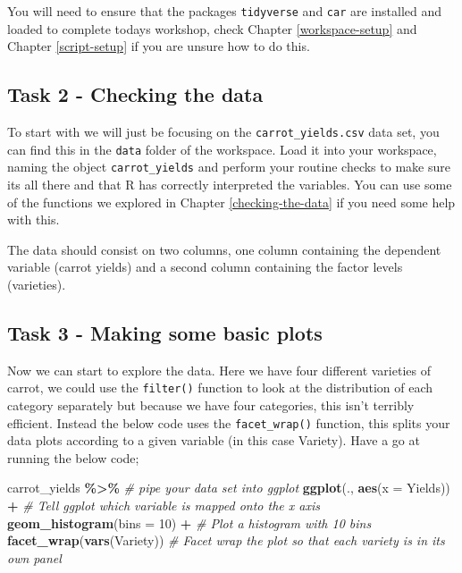 \documentclass[
]{book}
\newenvironment{Shaded}{\begin{snugshade}}{\end{snugshade}}
\newcommand{\AttributeTok}[1]{\textcolor[rgb]{0.13,0.29,0.53}{#1}}
\newcommand{\CommentTok}[1]{\textcolor[rgb]{0.56,0.35,0.01}{\textit{#1}}}
\newcommand{\DecValTok}[1]{\textcolor[rgb]{0.00,0.00,0.81}{#1}}
\newcommand{\FunctionTok}[1]{\textcolor[rgb]{0.13,0.29,0.53}{\textbf{#1}}}
\newcommand{\NormalTok}[1]{#1}
\newcommand{\SpecialCharTok}[1]{\textcolor[rgb]{0.81,0.36,0.00}{\textbf{#1}}}
\begin{document}
You will need to ensure that the packages \texttt{tidyverse} and \texttt{car} are installed and loaded to complete todays workshop, check Chapter \ref{workspace-setup} and Chapter \ref{script-setup} if you are unsure how to do this.

\subsection{Task 2 - Checking the data}\label{c5t2}

To start with we will just be focusing on the \texttt{carrot\_yields.csv} data set, you can find this in the \texttt{data} folder of the workspace. Load it into your workspace, naming the object \texttt{carrot\_yields} and perform your routine checks to make sure its all there and that R has correctly interpreted the variables. You can use some of the functions we explored in Chapter \ref{checking-the-data} if you need some help with this.

The data should consist on two columns, one column containing the dependent variable (carrot yields) and a second column containing the factor levels (varieties).

\subsection{Task 3 - Making some basic plots}\label{c5t3}

Now we can start to explore the data. Here we have four different varieties of carrot, we could use the \texttt{filter()} function to look at the distribution of each category separately but because we have four categories, this isn't terribly efficient. Instead the below code uses the \texttt{facet\_wrap()} function, this splits your data plots according to a given variable (in this case Variety). Have a go at running the below code;

\begin{Shaded}
\begin{Highlighting}[]
\NormalTok{carrot\_yields }\SpecialCharTok{\%\textgreater{}\%} \CommentTok{\# pipe your data set into ggplot}
  \FunctionTok{ggplot}\NormalTok{(., }\FunctionTok{aes}\NormalTok{(}\AttributeTok{x =}\NormalTok{ Yields)) }\SpecialCharTok{+} \CommentTok{\# Tell ggplot which variable is mapped onto the x axis}
  \FunctionTok{geom\_histogram}\NormalTok{(}\AttributeTok{bins =} \DecValTok{10}\NormalTok{) }\SpecialCharTok{+} \CommentTok{\# Plot a histogram with 10 bins}
  \FunctionTok{facet\_wrap}\NormalTok{(}\FunctionTok{vars}\NormalTok{(Variety)) }\CommentTok{\# Facet wrap the plot so that each variety is in its own panel}
\end{Highlighting}
\end{Shaded}
\end{document}
